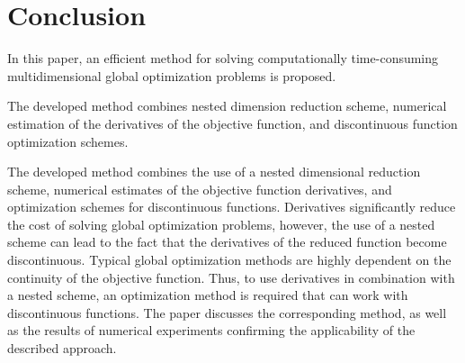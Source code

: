 \documentclass[runningheads]{llncs}
\begin{document}
\section*{Conclusion}\label{sec:conclusion}

In this paper, an efficient method for solving computationally time-consuming multidimensional global optimization problems is proposed.

The developed method combines nested dimension reduction scheme, numerical estimation of the derivatives of the objective function, and discontinuous function optimization schemes.

The developed method combines the use of a nested dimensional reduction scheme, numerical estimates of the objective function derivatives, and optimization schemes for discontinuous functions. Derivatives significantly reduce the cost of solving global optimization problems, however, the use of a nested scheme can lead to the fact that the derivatives of the reduced function become discontinuous. Typical global optimization methods are highly dependent on the continuity of the objective function. Thus, to use derivatives in combination with a nested scheme, an optimization method is required that can work with discontinuous functions. The paper discusses the corresponding method, as well as the results of numerical experiments confirming the applicability of the described approach.
\end{document}
